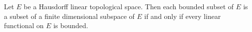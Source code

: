 Let $E$ be a Hausdorff linear topological space. Then each bounded subset of $E$ is a subset of a finite dimensional subspace of $E$ if and only if every linear functional on $E$ is bounded.
